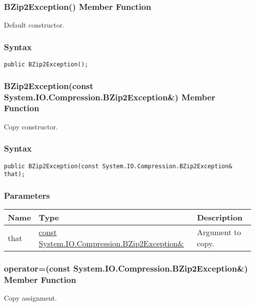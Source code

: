 \documentclass[a4paper,oneside,11.000000pt]{book}
\begin{document}
\clearpage

\hypertarget{System.IO.Compression.BZip2Exception.constructor.P.System.IO.Compression.BZip2Exception}{\subsubsection*{BZip2Exception() Member Function}}\begin{flushleft}
Default constructor.

\end{flushleft}
\subsubsection*{Syntax}
\texttt{public BZip2Exception();}
\clearpage

\hypertarget{System.IO.Compression.BZip2Exception.constructor.P.System.IO.Compression.BZip2Exception.C.R.System.IO.Compression.BZip2Exception}{\subsubsection*{BZip2Exception(const System.IO.Compression.BZip2Exception\&) Member Function}}\begin{flushleft}
Copy constructor.

\end{flushleft}
\subsubsection*{Syntax}
\texttt{public BZip2Exception(const System.IO.Compression.BZip2Exception\& that);}
\subsubsection*{Parameters}
\begin{flushleft}
\begin{supertabular}[l]{!{\raggedright}p{1.30721cm}!{\raggedright}p{8.55945cm}!{\raggedright}p{4.55908cm}}
\textbf{Name}
& \textbf{Type}
& \textbf{Description}
\\
\hline
that
& \hyperlink{System.IO.Compression.BZip2Exception}{const System.\-IO.\-Compression.\-BZip2Exception\&\-}
& Argument to copy.

\\
\end{supertabular}

\end{flushleft}
\clearpage

\hypertarget{System.IO.Compression.BZip2Exception.operator.assign.P.System.IO.Compression.BZip2Exception.C.R.System.IO.Compression.BZip2Exception}{\subsubsection*{operator=(const System.IO.Compression.BZip2Exception\&) Member Function}}\begin{flushleft}
Copy assignment.

\end{flushleft}
\end{document}
